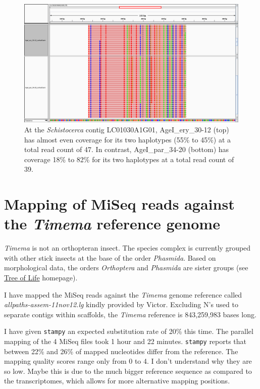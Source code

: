 \documentclass{article}\usepackage[]{graphicx}\usepackage[]{color}
\begin{document}
\begin{figure}
\centering
\includegraphics[width=\textwidth]{./figure/igv_LC01030A1G01}
\caption{At the \textit{Schistocerca} contig LC01030A1G01, AgeI\_ery\_30-12 (top) has almost even coverage for its two haplotypes (55\% to 45\%) at a total read count of 47. In contrast, AgeI\_par\_34-20 (bottom) has coverage 18\% to 82\% for its two haplotypes at a total read count of 39.}
\label{}
\end{figure}

\pagebreak


\section{Mapping of MiSeq reads against the \textit{Timema} reference genome}

\textit{Timema} is not an orthopteran insect. The species complex is currently grouped with other stick insects at the base of the order \textit{Phasmida}. Based on morphological data, the orders \textit{Orthoptera} and \textit{Phasmida} are sister groups (see \href{http://tolweb.org/Neoptera/8267}{Tree of Life} homepage).

I have mapped the MiSeq reads against the \textit{Timema} genome reference called \emph{allpaths-assem-11nov12.lg}  kindly provided by Victor. Excluding N's used to separate contigs within scaffolds, the \textit{Timema} reference is 843,259,983 bases long.

I have given \texttt{stampy} an expected substitution rate of 20\% this time. The parallel mapping of the 4 MiSeq files took 1 hour and 22 minutes. \texttt{stampy} reports that between 22\% and 26\% of mapped nucleotides differ from the reference. The mapping quality scores range only from 0 to 4. I don't understand why they are so low. Maybe this is due to the much bigger reference sequence as compared to the transcriptomes, which allows for more alternative mapping positions.
\end{document}
